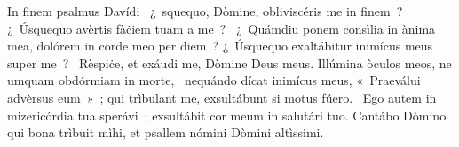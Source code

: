 { In finem psalmus Davídi}
{%
~¿~squequo, Dòmine, obliviscéris me in finem~? ¿~Úsquequo avèrtis fàċiem tuam a me~?
~¿~Quámdiu ponem consìlia in ànima mea, dolórem in corde meo per diem~? ¿~Úsquequo exaltábitur inimícus meus super me~?
~Rèspiċe, et exáudi me, Dòmine Deus meus. Illúmina òculos meos, ne umquam obdórmiam in morte,
~nequándo dícat inimícus meus, «~Praeválui advèrsus eum~»~; qui trìbulant me, exsultábunt si motus fúero.
~Ego autem in mizericórdia tua sperávi~; exsultábit cor meum in salutári tuo. Cantábo Dòmino qui bona trìbuit mìhi, et psallem nómini Dòmini altìssimi.
}
